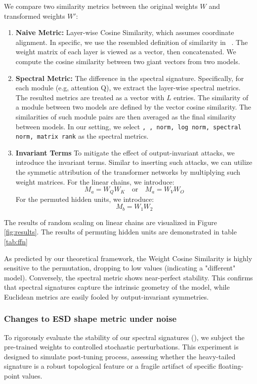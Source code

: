 We compare two similarity metrics between the original weights $W$ and transformed weights $W'$:

\begin{enumerate}

    \item \textbf{Naive Metric:} Layer-wise Cosine Similarity, which assumes coordinate alignment. In specific, we use the resembled definition of similarity in ~\cite{zeng2024HuRef}. The weight matrix of each layer is viewed as a vector, then concatenated. We compute the cosine similarity between two giant vectors from two models.
    \item \textbf{Spectral Metric:} The difference in the spectral signature. Specifically, for each module (e.g, attention Q), we extract the layer-wise spectral metrics. The resulted metrics are treated as a vector with $L$ entries. The similarity of a module between two models are defined by the vector cosine similarity. The similarities of such module pairs are then averaged as the final similarity between models. In our setting, we select \texttt{\ALPHAHILL, \STABLERANK, norm, log norm, spectral norm, matrix rank} as the spectral metrics.
    \item \textbf{Invariant Terms}
    To mitigate the effect of output-invariant attacks, we introduce the invariant terms. Similar to inserting such attacks, we can utilize the symmetic attribution of the transformer networks by multiplying such weight matrices. For the linear chains, we introduce:
    \[
    M_a = W_QW_K \quad \text{or} \quad M_a=W_VW_O
    \]
    For the permuted hidden units, we introduce:
    \[
    M_b=W_1W_2
    \]
\end{enumerate}

The results of random scaling on linear chains are visualized in Figure \ref{fig:results}. The results of permuting hidden units are demonstrated in table \ref{tab:ffn}

As predicted by our theoretical framework, the Weight Cosine Similarity is highly sensitive to the permutation, dropping to low values (indicating a "different" model). Conversely, the spectral metric \ALPHAHILL shows near-perfect stability. This confirms that spectral signatures capture the intrinsic geometry of the model, while Euclidean metrics are easily fooled by output-invariant symmetries.




\subsubsection{Changes to ESD shape metric under noise}
To rigorously evaluate the stability of our spectral signatures (\ALPHAHILL), we subject the pre-trained weights to controlled stochastic perturbations. This experiment is designed to simulate post-tuning process, assessing whether the heavy-tailed signature is a robust topological feature or a fragile artifact of specific floating-point values.
